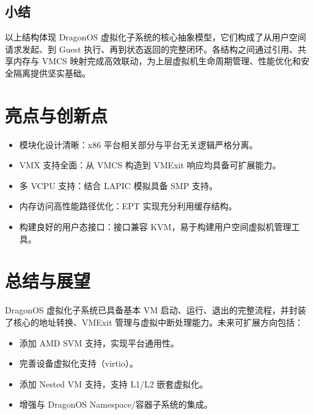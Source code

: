 \documentclass[analyze]{mancls}
\begin{document}
\subsection{小结}
以上结构体现 DragonOS 虚拟化子系统的核心抽象模型，它们构成了从用户空间请求发起、到 Guest 执行、再到状态返回的完整闭环。各结构之间通过引用、共享内存与 VMCS 映射完成高效联动，为上层虚拟机生命周期管理、性能优化和安全隔离提供坚实基础。

\section{亮点与创新点}

\begin{itemize}
  \item 模块化设计清晰：x86 平台相关部分与平台无关逻辑严格分离。
  \item VMX 支持全面：从 VMCS 构造到 VMExit 响应均具备可扩展能力。
  \item 多 VCPU 支持：结合 LAPIC 模拟具备 SMP 支持。
  \item 内存访问高性能路径优化：EPT 实现充分利用缓存结构。
  \item 构建良好的用户态接口：接口兼容 KVM，易于构建用户空间虚拟机管理工具。
\end{itemize}

\section{总结与展望}

DragonOS 虚拟化子系统已具备基本 VM 启动、运行、退出的完整流程，并封装了核心的地址转换、VMExit 管理与虚拟中断处理能力。未来可扩展方向包括：

\begin{itemize}
  \item 添加 AMD SVM 支持，实现平台通用性。
  \item 完善设备虚拟化支持（virtio）。
  \item 添加 Nested VM 支持，支持 L1/L2 嵌套虚拟化。
  \item 增强与 DragonOS Namespace/容器子系统的集成。
\end{itemize}
\end{document}
